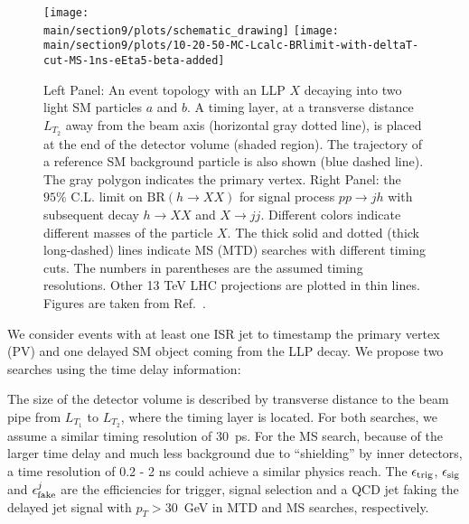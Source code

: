 \begin{figure}[t]
    \centering
    \texttt{[image: \\main/section9/plots/schematic\_drawing]} 
    \texttt{[image: \\main/section9/plots/10-20-50-MC-Lcalc-BRlimit-with-deltaT-cut-MS-1ns-eEta5-beta-added]} 
    \caption{ Left Panel: An event topology with an LLP $X$ decaying into two light SM particles $a$ and $b$. A timing 
    layer, at a transverse distance $L_{T_2}$ away from the beam axis (horizontal gray dotted line), is placed at the end of the detector volume 
    (shaded region). The trajectory of a reference SM background particle is also shown (blue dashed line).
    The gray polygon indicates the primary vertex.
    Right Panel: the $95\%$ C.L. limit on $\text{BR}(h \to XX)$ for signal process $pp \to j h$ with subsequent decay 
    $h\to X X$ and $X \to j j$. Different colors indicate different masses of the particle $X$. 
    The thick solid and dotted (thick long-dashed) lines indicate MS (MTD) searches with different timing cuts. The numbers in parentheses are 
    the assumed timing resolutions. Other 13 TeV LHC projections \cite{Coccaro:2016lnz, Bernaciak:2014pna} are plotted in thin lines. Figures are taken from Ref.~\cite{Liu:2018wte}.
    }
    \label{fig:ctaulimitHiggs}
\end{figure}

We consider events with at least one ISR jet to timestamp the primary vertex (PV) and one delayed SM object coming from the LLP decay. We propose two searches using the time delay information:
\begin{center}
\end{center}
The size of the detector volume is described by transverse distance to the beam pipe from $L_{T_1}$ to $L_{T_2}$, where the timing layer
is located. For both searches, we assume a similar timing resolution of 30~ps.
For the MS search, because of the larger time delay and much less background due to ``shielding'' by inner detectors, 
a time resolution of 0.2 - 2 ns could achieve a similar physics reach. The $\epsilon_{\rm trig}$, 
$\epsilon_{\rm sig}$ and $\epsilon_{\rm fake}^j$ are the efficiencies for trigger, signal selection and a QCD jet faking the delayed jet signal with $p_T>30$~GeV in MTD and MS searches, respectively. 

